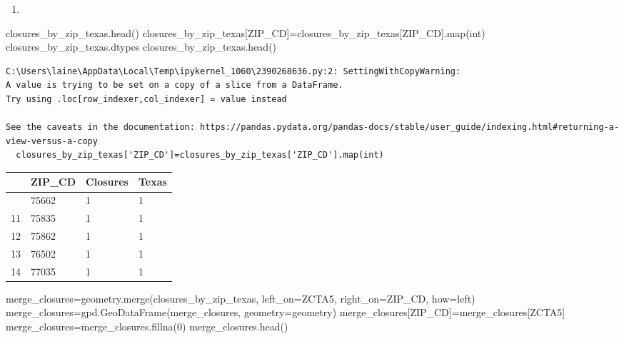 \documentclass[
  letterpaper,
  DIV=11,
  numbers=noendperiod]{scrartcl}
\newenvironment{Shaded}{\begin{snugshade}}{\end{snugshade}}
\newcommand{\BuiltInTok}[1]{\textcolor[rgb]{0.00,0.23,0.31}{#1}}
\newcommand{\DecValTok}[1]{\textcolor[rgb]{0.68,0.00,0.00}{#1}}
\newcommand{\NormalTok}[1]{\textcolor[rgb]{0.00,0.23,0.31}{#1}}
\newcommand{\OperatorTok}[1]{\textcolor[rgb]{0.37,0.37,0.37}{#1}}
\newcommand{\StringTok}[1]{\textcolor[rgb]{0.13,0.47,0.30}{#1}}
\providecommand{\tightlist}{%
  \setlength{\itemsep}{0pt}\setlength{\parskip}{0pt}}\usepackage{longtable,booktabs,array}
\begin{document}
\begin{enumerate}
\def\labelenumi{\arabic{enumi}.}
\setcounter{enumi}{1}
\tightlist
\item
\end{enumerate}

\begin{Shaded}
\begin{Highlighting}[]
\NormalTok{closures\_by\_zip\_texas.head()}
\NormalTok{closures\_by\_zip\_texas[}\StringTok{\textquotesingle{}ZIP\_CD\textquotesingle{}}\NormalTok{]}\OperatorTok{=}\NormalTok{closures\_by\_zip\_texas[}\StringTok{\textquotesingle{}ZIP\_CD\textquotesingle{}}\NormalTok{].}\BuiltInTok{map}\NormalTok{(}\BuiltInTok{int}\NormalTok{)}
\NormalTok{closures\_by\_zip\_texas.dtypes}
\NormalTok{closures\_by\_zip\_texas.head()}
\end{Highlighting}
\end{Shaded}

\begin{verbatim}
C:\Users\laine\AppData\Local\Temp\ipykernel_1060\2390268636.py:2: SettingWithCopyWarning: 
A value is trying to be set on a copy of a slice from a DataFrame.
Try using .loc[row_indexer,col_indexer] = value instead

See the caveats in the documentation: https://pandas.pydata.org/pandas-docs/stable/user_guide/indexing.html#returning-a-view-versus-a-copy
  closures_by_zip_texas['ZIP_CD']=closures_by_zip_texas['ZIP_CD'].map(int)
\end{verbatim}

\begin{longtable}[]{@{}llll@{}}
\toprule\noalign{}
& ZIP\_CD & Closures & Texas \\
\midrule\noalign{}
\endhead
\bottomrule\noalign{}
\endlastfoot
10 & 75662 & 1 & 1 \\
11 & 75835 & 1 & 1 \\
12 & 75862 & 1 & 1 \\
13 & 76502 & 1 & 1 \\
14 & 77035 & 1 & 1 \\
\end{longtable}

\begin{Shaded}
\begin{Highlighting}[]
\NormalTok{merge\_closures}\OperatorTok{=}\NormalTok{geometry.merge(closures\_by\_zip\_texas, left\_on}\OperatorTok{=}\StringTok{\textquotesingle{}ZCTA5\textquotesingle{}}\NormalTok{, right\_on}\OperatorTok{=}\StringTok{\textquotesingle{}ZIP\_CD\textquotesingle{}}\NormalTok{, how}\OperatorTok{=}\StringTok{\textquotesingle{}left\textquotesingle{}}\NormalTok{)}
\NormalTok{merge\_closures}\OperatorTok{=}\NormalTok{gpd.GeoDataFrame(merge\_closures, geometry}\OperatorTok{=}\StringTok{\textquotesingle{}geometry\textquotesingle{}}\NormalTok{)}
\NormalTok{merge\_closures[}\StringTok{\textquotesingle{}ZIP\_CD\textquotesingle{}}\NormalTok{]}\OperatorTok{=}\NormalTok{merge\_closures[}\StringTok{\textquotesingle{}ZCTA5\textquotesingle{}}\NormalTok{]}
\NormalTok{merge\_closures}\OperatorTok{=}\NormalTok{merge\_closures.fillna(}\DecValTok{0}\NormalTok{)}
\NormalTok{merge\_closures.head()}
\end{Highlighting}
\end{Shaded}
\end{document}
